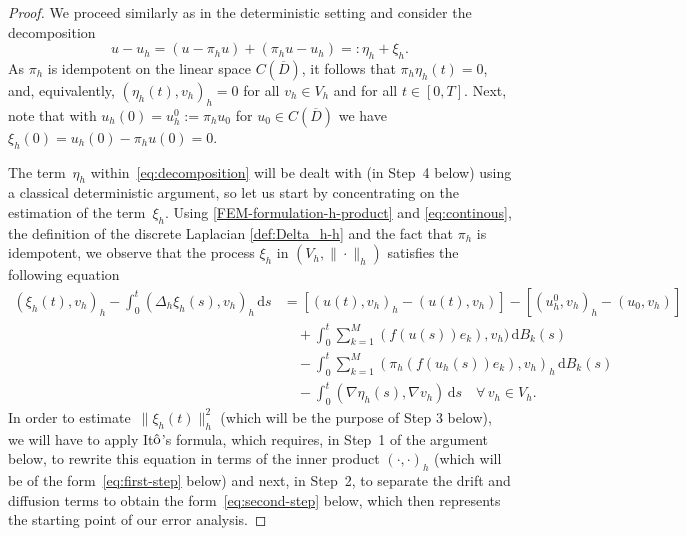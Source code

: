 \documentclass[12pt]{article}
\newcommand{\dd}{\,\mathrm{d}}
\begin{document}
{\begin{proof}
We proceed similarly as in the deterministic setting and consider the decomposition
\begin{equation}
\label{eq:decomposition}
    u - u_h = (u - \pi_h u) + (\pi_h u-u_h) =: \eta_h + \xi_h.
\end{equation}
%
As $\pi_h$ is idempotent on the linear space $C(\overline{D})$, it follows that $\pi_h \eta_h(t)=0$, and, equivalently, $(\eta_h(t),v_h)_h=0$ for all $v_h \in V_h$ and for all $t \in [0,T]$.
Next, note that with $u_h(0)=u_h^0 :=\pi_hu_0$ for $u_0 \in C(\overline{D})$ we have $\xi_h(0) = u_h(0) - \pi_h u(0) = 0$. 

The term~$\eta_h$ within~\eqref{eq:decomposition} will be dealt with (in Step~4 below) using a classical deterministic argument, so let us start by concentrating on the estimation of the term~$\xi_h$.
Using \eqref{FEM-formulation-h-product} and \eqref{eq:continous}, the definition of the discrete Laplacian \eqref{def:Delta_h-h} and the fact that $\pi_h$ is idempotent, we observe that the process $\xi_h$ in $(V_h, \|\cdot\|_h)$ satisfies the following equation 
\begin{align*}
    ( \xi_h(t), v_h)_h - \int_0^t ( \Delta_h \xi_h(s),  v_h)_h \dd s 
    &= [(u(t),v_h)_h - (u(t),v_h)] - [  (u^0_h, v_h)_h -  (u_0, v_h)]\\
    &\quad   + \int_0^t \sum_{k=1}^M (f(u(s))e_k), v_h) \dd B_k(s)\\
   & \quad -\int_0^t \sum_{k=1}^M (\pi_h(f(u_h(s))e_k), v_h)_h \dd B_k(s)\\
   &\quad - \int_0^t (\nabla \eta_h(s), \nabla v_h)\dd s \quad \forall\,  v_h \in V_h.
\end{align*}
%
In order to estimate~$ \|\xi_h(t)\|^2_h$ (which will be the purpose of Step 3 below), we will have to apply It$\hat{\rm{o}}$'s formula, which requires, in Step~1 of the argument below, to rewrite this equation in terms of the inner product $(\cdot,\cdot)_h$ (which will be of the form~\eqref{eq:first-step} below) and next, in Step~2, to separate the drift and diffusion terms to obtain the form~\eqref{eq:second-step} below, which then represents the starting point of our error analysis.

\smallskip 


\end{proof}}
\end{document}
